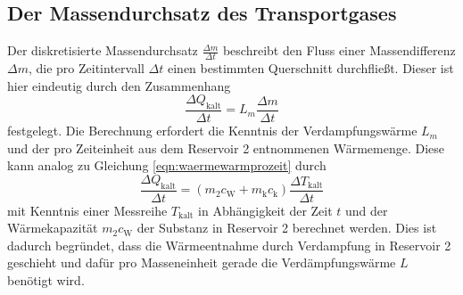 \subsection{Der Massendurchsatz des Transportgases}
Der diskretisierte Massendurchsatz $\frac{\Delta m}{\Delta t}$ beschreibt den Fluss einer Massendifferenz $\Delta m$, die
pro Zeitintervall $\Delta t$ einen bestimmten Querschnitt durchfließt.
Dieser ist hier eindeutig durch den Zusammenhang
\begin{equation}
  \frac{\Delta Q_\text{kalt}}{\Delta t} = L_m \frac{\Delta m}{\Delta t}
  \label{eqn:massendurchsatz}
\end{equation}
festgelegt. Die Berechnung erfordert die Kenntnis der Verdampfungswärme $L_m$ und
der pro Zeiteinheit aus dem Reservoir 2 entnommenen Wärmemenge. Diese kann analog zu
Gleichung \eqref{eqn:waermewarmprozeit} durch
\begin{equation}
  \frac{\Delta Q_\text{kalt}}{\Delta t} = (m_2 c_\text{W} + m_\text{k} c_\text{k}) \frac{\Delta T_\text{kalt}}{\Delta t}
  \label{eqn:waermekaltprozeit}
\end{equation}
mit Kenntnis einer Messreihe $T_\text{kalt}$ in Abhängigkeit der Zeit $t$ und
der Wärmekapazität $m_2 c_\text{W}$ der Substanz in Reservoir 2 berechnet werden.
Dies ist dadurch begründet, dass die Wärmeentnahme durch Verdampfung in Reservoir 2 geschieht
und dafür pro Masseneinheit gerade die Verdämpfungswärme $L$ benötigt wird.
